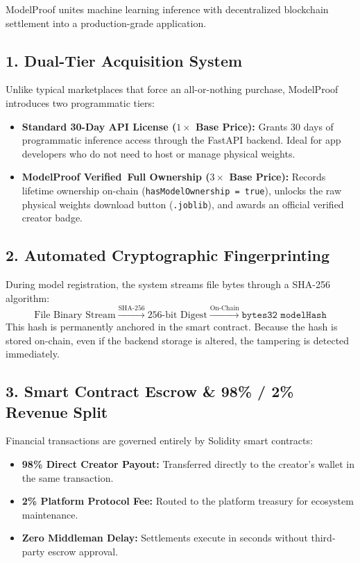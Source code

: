 \documentclass[11pt,a4paper]{article}
\begin{document}
ModelProof unites machine learning inference with decentralized blockchain settlement into a production-grade application.

\subsection{1. Dual-Tier Acquisition System}
Unlike typical marketplaces that force an all-or-nothing purchase, ModelProof introduces two programmatic tiers:
\begin{itemize}[leftmargin=1.5em]
    \item \textbf{Standard 30-Day API License ($1\times$ Base Price):} Grants 30 days of programmatic inference access through the FastAPI backend. Ideal for app developers who do not need to host or manage physical weights.
    \item \textbf{ModelProof Verified\texttrademark\ Full Ownership ($3\times$ Base Price):} Records lifetime ownership on-chain (\texttt{hasModelOwnership = true}), unlocks the raw physical weights download button (\texttt{.joblib}), and awards an official verified creator badge.
\end{itemize}

\subsection{2. Automated Cryptographic Fingerprinting}
During model registration, the system streams file bytes through a SHA-256 algorithm:
\[
\text{File Binary Stream} \xrightarrow{\text{SHA-256}} \text{256-bit Digest} \xrightarrow{\text{On-Chain}} \texttt{bytes32 modelHash}
\]
This hash is permanently anchored in the smart contract. Because the hash is stored on-chain, even if the backend storage is altered, the tampering is detected immediately.

\subsection{3. Smart Contract Escrow \& 98\% / 2\% Revenue Split}
Financial transactions are governed entirely by Solidity smart contracts:
\begin{itemize}[leftmargin=1.5em]
    \item \textbf{98\% Direct Creator Payout:} Transferred directly to the creator's wallet in the same transaction.
    \item \textbf{2\% Platform Protocol Fee:} Routed to the platform treasury for ecosystem maintenance.
    \item \textbf{Zero Middleman Delay:} Settlements execute in seconds without third-party escrow approval.
\end{itemize}
\end{document}
